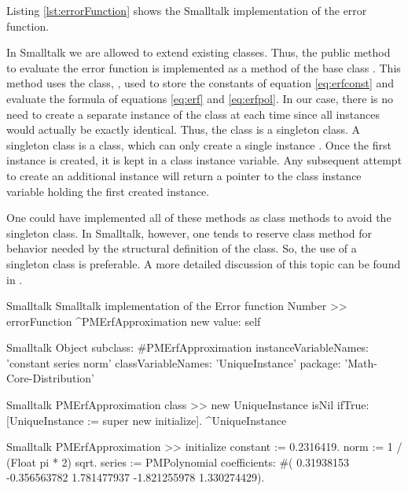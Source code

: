 Listing \ref{lst:errorFunction} shows the Smalltalk implementation
of the error function.

In Smalltalk we are allowed to extend existing classes. Thus, the
public method to evaluate the error function is implemented as a
method of the base class . This method uses the class,
, used to store the constants of equation
\ref{eq:erfconst} and evaluate the formula of equations
\ref{eq:erf} and \ref{eq:erfpol}. In our case, there is no need to
create a separate instance of the class 
at each time since all instances would actually be exactly
identical. Thus, the class  is a
singleton class. A singleton class is a class, which can only
create a single instance \cite{GoF}. Once the first instance is
created, it is kept in a class instance variable. Any subsequent
attempt to create an additional instance will return a pointer to
the class instance variable holding the first created instance.

One could have implemented all of these methods as class methods
to avoid the singleton class. In Smalltalk, however, one tends to
reserve class method for behavior needed by the structural
definition of the class. So, the use of a singleton class is
preferable. A more detailed discussion of this topic can be found
in \cite{StDesPat}.

\begin{listing}[label=lst:errorFunction]{Smalltalk}
{Smalltalk implementation of the Error function}
Number >> errorFunction
    ^PMErfApproximation new value: self
\end{listing}

\begin{displaycode}{Smalltalk}
Object subclass: #PMErfApproximation
   instanceVariableNames: 'constant series norm'
   classVariableNames: 'UniqueInstance'
   package: 'Math-Core-Distribution'
\end{displaycode}

\begin{displaycode}{Smalltalk}
PMErfApproximation class >> new
    UniqueInstance isNil
        ifTrue: [UniqueInstance := super new initialize].
    ^UniqueInstance
\end{displaycode}

\begin{displaycode}{Smalltalk}
PMErfApproximation >> initialize
    constant := 0.2316419.
    norm := 1 / (Float pi * 2) sqrt.
    series := PMPolynomial coefficients: #( 0.31938153 -0.356563782 
                               1.781477937 -1.821255978 1.330274429). 
\end{displaycode}

